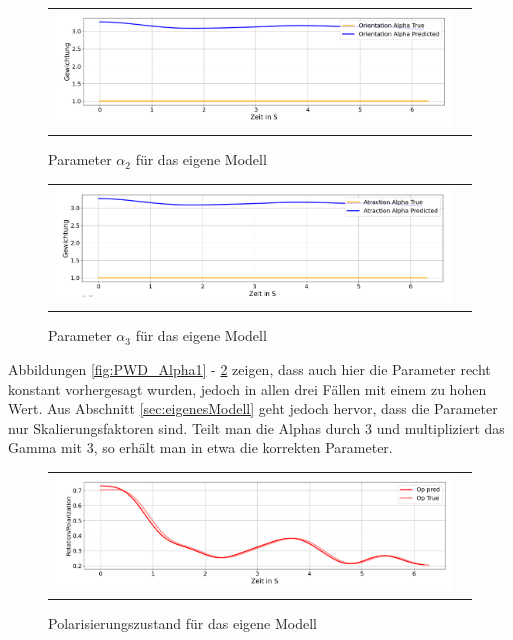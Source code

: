 \begin{figure}[H]
\centering
\begin{tabular}{cc}
\includegraphics[width=1.0\textwidth]{figures/Experimente/10Fisch/PWD_alpha2.png} 
\end{tabular}
\caption{Parameter $\alpha_2$ für das eigene Modell \label{fig:PWD_Alpha2}}
\end{figure}



\begin{figure}[H]
\centering
\begin{tabular}{cc}
\includegraphics[width=1.0\textwidth]{figures/Experimente/10Fisch/PWD_alpha3.png} 
\end{tabular}
\caption{Parameter $\alpha_3$ für das eigene Modell \label{fig:PWD_Alpha3}}
\end{figure}

Abbildungen \ref{fig:PWD_Alpha1} - \ref{fig:PWD_Alpha3} zeigen, dass auch hier die Parameter recht konstant vorhergesagt wurden, jedoch in allen drei Fällen mit einem zu hohen Wert. Aus Abschnitt \ref{sec:eigenesModell} geht jedoch hervor, dass die Parameter nur Skalierungsfaktoren sind. Teilt man die Alphas durch 3 und multipliziert das Gamma mit 3, so erhält man in etwa die korrekten Parameter.


\begin{figure}[H]
\centering
\begin{tabular}{cc}
\includegraphics[width=1.0\textwidth]{figures/Experimente/10Fisch/PWD_Pol.png} 
\end{tabular}
\caption{Polarisierungszustand für das eigene Modell \label{fig:PWD_Pol}}
\end{figure}

